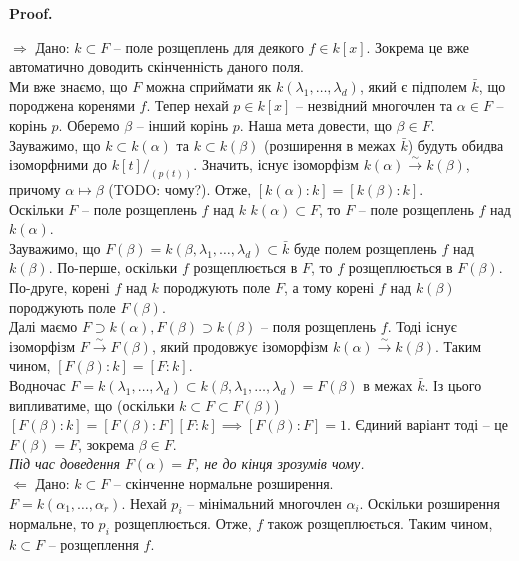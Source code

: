 \documentclass[a4paper, 10pt]{article}
\makeatletter
\def\rightproof{$\boxed{\Rightarrow}$ }
\def\leftproof{$\boxed{\Leftarrow}$ }
\theoremstyle{theoremdd}
\theoremstyle{theoremdd}
\theoremstyle{theoremdd}
\theoremstyle{theoremdd}
\theoremstyle{theoremdd}
\theoremstyle{theoremdd}
\theoremstyle{theoremdd}
\theoremstyle{theoremdd}
\theoremstyle{theoremdd}
\theoremstyle{theoremdd}
\theoremstyle{theoremdd}
\theoremstyle{theoremdd}
\theoremstyle{theoremdd}
\theoremstyle{theoremdd}
\theoremstyle{theoremdd}
\renewenvironment{proof}[1][Proof.\\]{\par
\pushQED{\hfill \qed}%
\normalfont \topsep6\p@\@plus6\p@\relax
\trivlist
\item\relax
{\bfseries
#1\@addpunct{.}}\hspace\labelsep\ignorespaces
}{%
\popQED\endtrivlist\@endpefalse
}
\makeatother
\begin{document}
\begin{proof}
\rightproof Дано: $k \subset F$ -- поле розщеплень для деякого $f \in k[x]$. Зокрема це вже автоматично доводить скінченність даного поля.\\
Ми вже знаємо, що $F$ можна сприймати як $k(\lambda_1,\dots,\lambda_d)$, який є підполем $\bar{k}$, що породжена коренями $f$. Тепер нехай $p \in k[x]$ -- незвідний многочлен та $\alpha \in F$ -- корінь $p$. Оберемо $\beta$ -- інший корінь $p$. Наша мета довести, що $\beta \in F$.\\
Зауважимо, що $k \subset k(\alpha)$ та $k \subset k(\beta)$ (розширення в межах $\bar{k}$) будуть обидва ізоморфними до $k[t]/_{(p(t))}$. Значить, існує ізоморфізм $k(\alpha) \overset{\sim}{\to} k(\beta)$, причому $\alpha \mapsto \beta$ (TODO: чому?). Отже, $[k(\alpha):k] = [k(\beta):k]$.\\
Оскільки $F$ -- поле розщеплень $f$ над $k$  $k(\alpha) \subset F$, то $F$ -- поле розщеплень $f$ над $k(\alpha)$.\\
Зауважимо, що $F(\beta) = k(\beta,\lambda_1,\dots,\lambda_d) \subset \bar{k}$ буде полем розщеплень $f$ над $k(\beta)$. По-перше, оскільки $f$ розщеплюється в $F$, то $f$ розщеплюється в $F(\beta)$. По-друге, корені $f$ над $k$ породжують поле $F$, а тому корені $f$ над $k(\beta)$ породжують поле $F(\beta)$.\\
Далі маємо $F\supset k(\alpha), F(\beta) \supset k(\beta)$ -- поля розщеплень $f$. Тоді існує ізоморфізм $F \overset{\sim}{\to} F(\beta)$, який продовжує ізоморфізм $k(\alpha) \overset{\sim}{\to} k(\beta)$. Таким чином, $[F(\beta):k] = [F:k]$.\\
Водночас $F = k(\lambda_1,\dots,\lambda_d) \subset k(\beta,\lambda_1,\dots,\lambda_d) = F(\beta)$ в межах $\bar{k}$. Із цього випливатиме, що (оскільки $k \subset F \subset F(\beta)$) $[F(\beta):k] = [F(\beta):F][F:k] \implies [F(\beta):F] = 1$. Єдиний варіант тоді -- це $F(\beta) = F$, зокрема $\beta \in F$.\\
\textit{Під час доведення $F(\alpha) = F$, не до кінця зрозумів чому.}
\bigskip \\
\leftproof Дано: $k \subset F$ -- скінченне нормальне розширення.\\
$F = k(\alpha_1,\dots,\alpha_r)$. Нехай $p_i$ -- мінімальний многочлен $\alpha_i$. Оскільки розширення нормальне, то $p_i$ розщеплюється. Отже, $f$ також розщеплюється. Таким чином, $k \subset F$ -- розщеплення $f$.
\end{proof}
\end{document}
